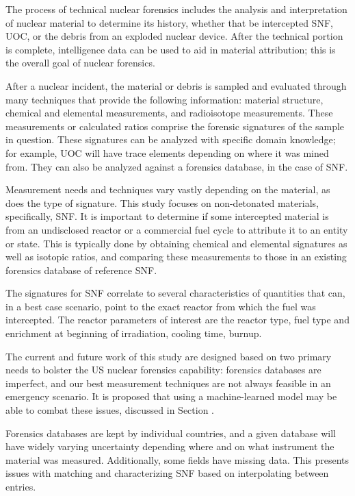 The process of technical nuclear forensics includes the analysis and
interpretation of nuclear material to determine its history, whether that be
intercepted \gls{SNF}, \gls{UOC}, or the debris from an exploded nuclear
device. After the technical portion is complete, intelligence data can be used
to aid in material attribution; this is the overall goal of nuclear forensics. 

After a nuclear incident, the material or debris is sampled and evaluated
through many techniques that provide the following information: material
structure, chemical and elemental measurements, and radioisotope measurements.
These measurements or calculated ratios comprise the forensic signatures of the
sample in question. These signatures can be analyzed with specific domain
knowledge; for example, \gls{UOC} will have trace elements depending on where
it was mined from.  They can also be analyzed against a forensics database, in
the case of \gls{SNF}.

Measurement needs and techniques vary vastly depending on the material, as does
the type of signature. This study focuses on non-detonated materials,
specifically, \gls{SNF}. It is important to determine if some intercepted
material is from an undisclosed reactor or a commercial fuel cycle to attribute
it to an entity or state. This is typically done by obtaining chemical and
elemental signatures as well as isotopic ratios, and comparing these
measurements to those in an existing forensics database of reference \gls{SNF}. 

The signatures for \gls{SNF} correlate to several characteristics of quantities
that can, in a best case scenario, point to the exact reactor from which the
fuel was intercepted. The reactor parameters of interest are the reactor type,
fuel type and enrichment at beginning of irradiation, cooling time, burnup.
 

The current and future work of this study are designed based on two primary
needs to bolster the \gls{US} nuclear forensics capability: forensics databases
are imperfect, and our best measurement techniques are not always feasible in
an emergency scenario. It is proposed that using a machine-learned model may be
able to combat these issues, discussed in Section . 

Forensics databases are kept by individual countries, and a given database will
have widely varying uncertainty depending where and on what instrument the
material was measured. Additionally, some fields have missing data. This
presents issues with matching and characterizing \gls{SNF} based on
interpolating between entries. 

